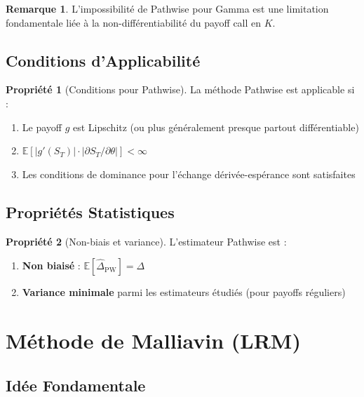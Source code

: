 \documentclass[a4paper,11pt]{article}
\theoremstyle{definition}
\newtheorem{propriete}{Propriété}[section]
\newtheorem{remarque}{Remarque}[section]
\begin{document}
\begin{remarque}
L'impossibilité de Pathwise pour Gamma est une limitation fondamentale liée à la non-différentiabilité du payoff call en $K$.
\end{remarque}

\subsection{Conditions d'Applicabilité}

\begin{propriete}[Conditions pour Pathwise]
La méthode Pathwise est applicable si :
\begin{enumerate}
    \item Le payoff $g$ est Lipschitz (ou plus généralement presque partout différentiable)
    \item $\mathbb{E}[|g'(S_T)| \cdot |\partial S_T / \partial \theta|] < \infty$
    \item Les conditions de dominance pour l'échange dérivée-espérance sont satisfaites
\end{enumerate}
\end{propriete}

\subsection{Propriétés Statistiques}

\begin{propriete}[Non-biais et variance]
L'estimateur Pathwise est :
\begin{enumerate}
    \item \textbf{Non biaisé} : $\mathbb{E}[\hat{\Delta}_{\text{PW}}] = \Delta$
    \item \textbf{Variance minimale} parmi les estimateurs étudiés (pour payoffs réguliers)
\end{enumerate}
\end{propriete}

\section{Méthode de Malliavin (LRM)}

\subsection{Idée Fondamentale}
\end{document}
